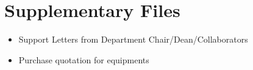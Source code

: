 \section{Supplementary Files}


\begin{itemize}
\item Support Letters from Department Chair/Dean/Collaborators
\item Purchase quotation for equipments
\end{itemize}
